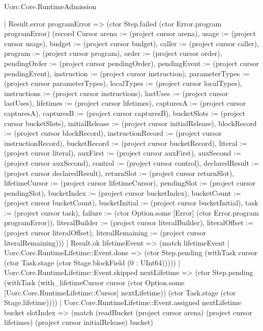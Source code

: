 \begin{lexlean}{Uorc.Core.RuntimeAdmission}
\begin{semanticmodule}
{          | Result.error programError => (ctor Step.failed (ctor Error.program programError) (record Cursor {arena := (project cursor arena), usage := (project cursor usage), budget := (project cursor budget), caller := (project cursor caller), program := (project cursor program), order := (project cursor order), pendingOrder := (project cursor pendingOrder), pendingEvent := (project cursor pendingEvent), instruction := (project cursor instruction), parameterTypes := (project cursor parameterTypes), localTypes := (project cursor localTypes), instructions := (project cursor instructions), lastUses := (project cursor lastUses), lifetimes := (project cursor lifetimes), capturesA := (project cursor capturesA), capturesB := (project cursor capturesB), bucketSlots := (project cursor bucketSlots), initialRelease := (project cursor initialRelease), blockRecord := (project cursor blockRecord), instructionRecord := (project cursor instructionRecord), bucketRecord := (project cursor bucketRecord), literal := (project cursor literal), auxFirst := (project cursor auxFirst), auxSecond := (project cursor auxSecond), control := (project cursor control), declaredResult := (project cursor declaredResult), returnSlot := (project cursor returnSlot), lifetimeCursor := (project cursor lifetimeCursor), pendingSlot := (project cursor pendingSlot), bucketIndex := (project cursor bucketIndex), bucketCount := (project cursor bucketCount), bucketInitial := (project cursor bucketInitial), task := (project cursor task), failure := (ctor Option.some [Error] (ctor Error.program programError)), literalBuilder := (project cursor literalBuilder), literalOffset := (project cursor literalOffset), literalRemaining := (project cursor literalRemaining)}))
          | Result.ok lifetimeEvent => (match lifetimeEvent
            | Uorc.Core.RuntimeLifetime::Event.done => (ctor Step.pending (withTask cursor (ctor Task.stage (ctor Stage.blockField (0 : UInt64)))))
            | Uorc.Core.RuntimeLifetime::Event.skipped nextLifetime => (ctor Step.pending (withTask (with_lifetimeCursor cursor (ctor Option.some [Uorc.Core.RuntimeLifetime::Cursor] nextLifetime)) (ctor Task.stage (ctor Stage.lifetime))))
            | Uorc.Core.RuntimeLifetime::Event.assigned nextLifetime bucket slotIndex => (match (readBucket (project cursor arena) (project cursor lifetimes) (project cursor initialRelease) bucket)
}
\end{semanticmodule}
\end{lexlean}
